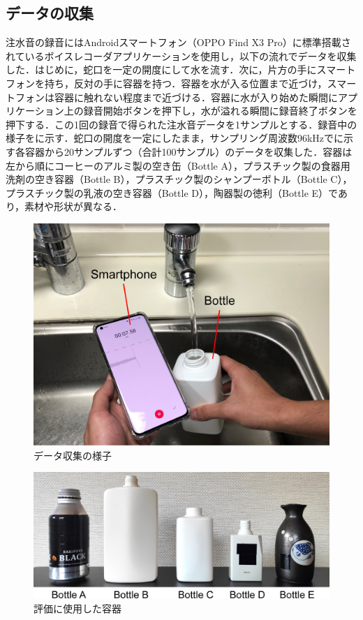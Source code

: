 \documentclass[submit,techrep,noauthor]{ipsj}
\begin{document}
\subsection{データの収集}
注水音の録音にはAndroidスマートフォン（OPPO Find X3 Pro）に標準搭載されているボイスレコーダアプリケーションを使用し，以下の流れでデータを収集した．はじめに，蛇口を一定の開度にして水を流す．次に，片方の手にスマートフォンを持ち，反対の手に容器を持つ．容器を水が入る位置まで近づけ，スマートフォンは容器に触れない程度まで近づける．容器に水が入り始めた瞬間にアプリケーション上の録音開始ボタンを押下し，水が溢れる瞬間に録音終了ボタンを押下する．この1回の録音で得られた注水音データを1サンプルとする．録音中の様子をに示す．蛇口の開度を一定にしたまま，サンプリング周波数96kHzでに示す各容器から20サンプルずつ（合計100サンプル）のデータを収集した．容器は左から順にコーヒーのアルミ製の空き缶（Bottle A），プラスチック製の食器用洗剤の空き容器（Bottle B），プラスチック製のシャンプーボトル（Bottle C），プラスチック製の乳液の空き容器（Bottle D），陶器製の徳利（Bottle E）であり，素材や形状が異なる．

\begin{figure}[!t]
  \centering
  \includegraphics[width=1\linewidth]{figures/data_acquisition.eps}
  \caption{データ収集の様子}
  \label{fig:data_acquisition}
\end{figure}

\begin{figure}[!t]
  \centering
  \includegraphics[width=1\linewidth]{figures/bottles.eps}
  \caption{評価に使用した容器}
  \label{fig:bottles}
\end{figure}
\end{document}
